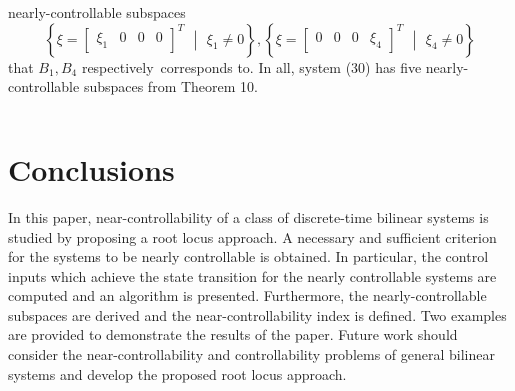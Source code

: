 \documentclass[journal,a4paper,12pt,onecolumn]{IEEEtran}
\begin{document}
nearly-controllable subspaces\begin{equation*}
\left\{ \xi =\left[
\begin{array}{cccc}
\xi _{1} & 0 & 0 & 0\end{array}\right] ^{T}\text{ }\left\vert \text{ }\xi _{1}\neq 0\right. \right\} ,\text{
}\left\{ \xi =\left[
\begin{array}{cccc}
0 & 0 & 0 & \xi _{4}\end{array}\right] ^{T}\text{ }\left\vert \text{ }\xi _{4}\neq 0\right. \right\}
\end{equation*}that $B_{1},B_{4}$ respectively\ corresponds to. In all, system (30) has
five nearly-controllable subspaces from Theorem 10.

$\left. {}\right. $

\section{Conclusions}

In this paper, near-controllability of a class of discrete-time bilinear
systems is studied by proposing a root locus approach. A necessary and
sufficient criterion for the systems to be nearly controllable is obtained.
In particular, the control inputs which achieve the state transition for the
nearly controllable systems are computed and an algorithm is presented.
Furthermore, the nearly-controllable subspaces are derived and the
near-controllability index is defined. Two examples are provided to
demonstrate the results of the paper. Future work should consider the
near-controllability and controllability problems of general bilinear
systems and develop the proposed root locus approach.

$\left. {}\right. $
\end{document}
